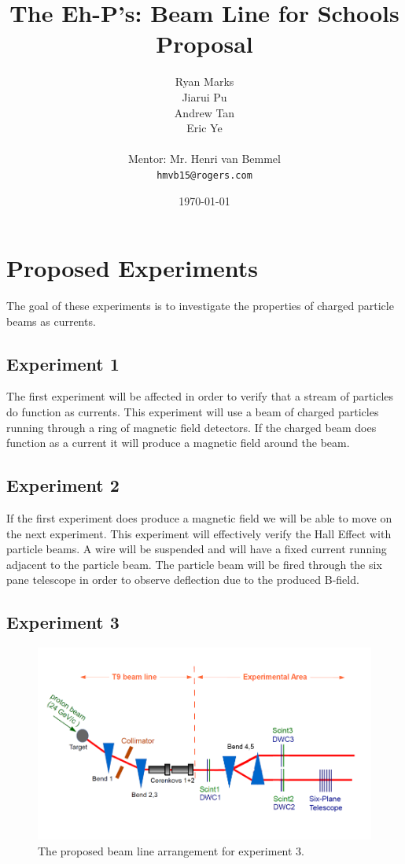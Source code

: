 \documentclass[12pt,letterpaper]{article}
\begin{document}
\title{The Eh-P's: Beam Line for Schools Proposal}
\author{
Ryan Marks\\
Jiarui Pu \\ 
Andrew Tan\\
Eric Ye\\
\\
Mentor: Mr. Henri van Bemmel\\
\normalsize{\texttt{hmvb15@rogers.com}}
}

\date{\today}
\maketitle
\section{Proposed Experiments}
The goal of these experiments is to investigate the properties of charged particle beams as currents.

\subsection{Experiment 1}
The first experiment will be affected in order to verify that a stream of particles do function as currents.
This experiment will use a beam of charged particles running through a ring of magnetic field detectors.
If the charged beam does function as a current it will produce a magnetic field around the beam.

\subsection{Experiment 2}
If the first experiment does produce a magnetic field we will be able to move on the next experiment.
This experiment will effectively verify the Hall Effect with particle beams. 
A wire will be suspended and will have a fixed current running adjacent to the particle beam.
The particle beam will be fired through the six pane telescope in order to observe deflection due to the produced B-field.

\subsection{Experiment 3}
\label{experiment_setup3}
\begin{figure}[h]
  \centering
\includegraphics[]{experimental_setup3.png}
 \caption{The proposed beam line arrangement for experiment 3.}
\end{figure}
\end{document}
